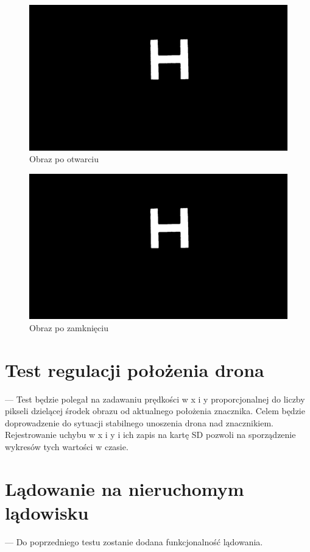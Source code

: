 \begin{figure}[h]
	\centering
	\includegraphics[width=\textwidth]{opened.jpg}
	\caption{Obraz po otwarciu}
	\label{fig:opened}
\end{figure}
\begin{figure}[h]
	\centering
	\includegraphics[width=\textwidth]{closed.jpg}
	\caption{Obraz po zamknięciu}
	\label{fig:closed}
\end{figure}

\section{Test regulacji położenia drona}
\label{sec:test_regulacji_polozenia_drona}
--- Test będzie polegał na zadawaniu prędkości w x i y proporcjonalnej do liczby pikseli dzielącej środek obrazu od aktualnego położenia znacznika. 
Celem będzie doprowadzenie do sytuacji stabilnego unoszenia drona nad znacznikiem. 
Rejestrowanie uchybu w x i y i ich zapis na kartę SD pozwoli na sporządzenie wykresów tych wartości w czasie.

\section{Lądowanie na nieruchomym lądowisku}
\label{sec:ladowanie_na_nieruchomym_ladowisku}
--- Do poprzedniego testu zostanie dodana funkcjonalność lądowania.
